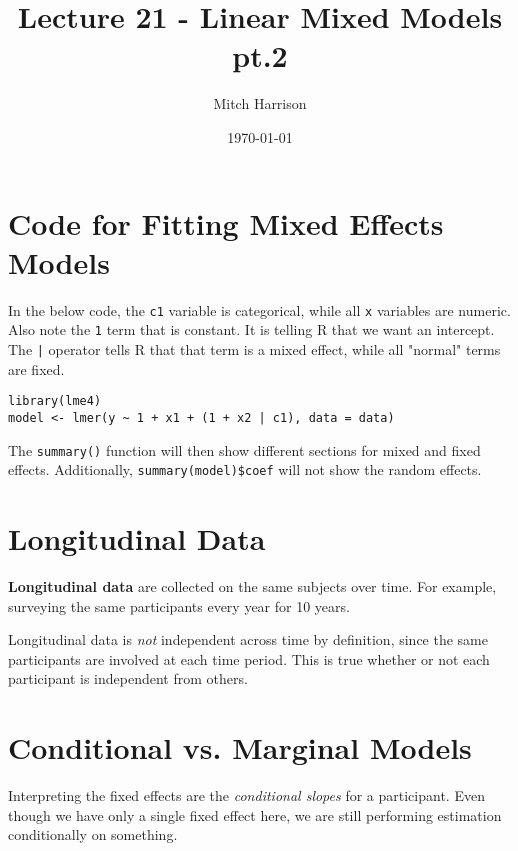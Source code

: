 \documentclass[titlepage, 12pt, leqno]{article}
\title{\Huge{Lecture 21 - Linear Mixed Models pt.2}}
\author{\large{Mitch Harrison}}
\date{\today}
\begin{document}
\maketitle
\tableofcontents
\newpage

\section{Code for Fitting Mixed Effects Models}

In the below code, the \texttt{c1} variable is categorical, while all \texttt{x} variables
are numeric. Also note the \texttt{1} term that is constant. It is telling R that we want
an intercept. The \texttt{|} operator tells R that that term is a mixed effect, while
all "normal" terms are fixed.

\begin{verbatim}
library(lme4)
model <- lmer(y ~ 1 + x1 + (1 + x2 | c1), data = data)
\end{verbatim}

\begin{note}
    The \texttt{summary()} function will then show different sections for mixed and fixed
    effects. Additionally, \texttt{summary(model)\$coef} will not show the random effects.
\end{note}

\pagebreak
\section{Longitudinal Data}
\begin{definition}
    \textbf{Longitudinal data} are collected on the same subjects over time. For example,
    surveying the same participants every year for 10 years.
\end{definition}

Longitudinal data is \textit{not} independent across time by definition, since the same
participants are involved at each time period. This is true whether or not each participant
is independent from others.

\pagebreak
\section{Conditional vs. Marginal Models}
Interpreting the fixed effects are the \textit{conditional slopes} for a participant. Even
though we have only a single fixed effect here, we are still performing estimation
conditionally on something.
\end{document}
